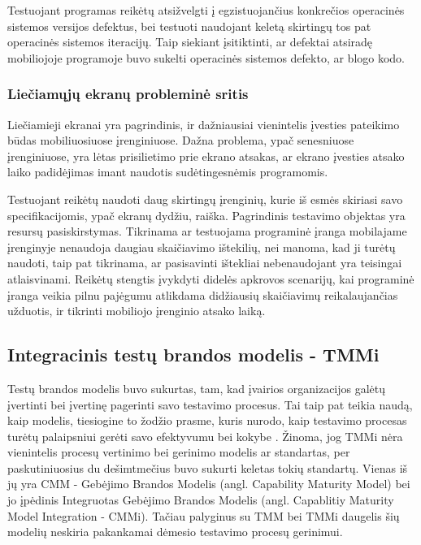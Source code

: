 \documentclass{VUMIFPSkursinis}
\begin{document}
Testuojant programas reikėtų atsižvelgti į egzistuojančius konkrečios operacinės sistemos versijos defektus, bei testuoti naudojant keletą skirtingų tos pat operacinės sistemos iteracijų. Taip siekiant įsitiktinti, ar defektai atsiradę mobiliojoje programoje buvo sukelti operacinės sistemos defekto, ar blogo kodo.

\subsubsection{Liečiamųjų ekranų probleminė sritis}
Liečiamieji ekranai yra pagrindinis, ir dažniausiai vienintelis įvesties pateikimo būdas mobiliuosiuose įrenginiuose. Dažna problema, ypač senesniuose įrenginiuose, yra lėtas prisilietimo prie ekrano atsakas, ar ekrano įvesties atsako laiko padidėjimas imant naudotis sudėtingesnėmis programomis.

Testuojant reikėtų naudoti daug skirtingų įrenginių, kurie iš esmės skiriasi savo specifikacijomis, ypač ekranų dydžiu, raiška. Pagrindinis testavimo objektas yra resursų pasiskirstymas. Tikrinama ar testuojama programinė įranga mobilajame įrenginyje nenaudoja daugiau skaičiavimo ištekilių, nei manoma, kad ji turėtų naudoti, taip pat tikrinama, ar pasisavinti ištekliai nebenaudojant yra teisingai atlaisvinami. Reikėtų stengtis įvykdyti didelės apkrovos scenarijų, kai programinė įranga veikia pilnu pajėgumu atlikdama didžiausių skaičiavimų reikalaujančias užduotis, ir tikrinti mobiliojo įrenginio atsako laiką.

\subsection{Integracinis testų brandos modelis - TMMi}
Testų brandos modelis buvo sukurtas, tam, kad įvairios organizacijos galėtų įvertinti bei įvertinę pagerinti savo testavimo procesus. Tai taip pat teikia naudą, kaip modelis, tiesiogine to žodžio prasme, kuris nurodo, kaip testavimo procesas turėtų  palaipsniui gerėti savo efektyvumu bei kokybe \cite{Burnstein:2010:PST:1965566}. Žinoma, jog TMMi nėra vienintelis procesų vertinimo bei gerinimo modelis ar standartas, per paskutiniuosius du dešimtmečius buvo sukurti keletas tokių standartų. Vienas iš jų yra CMM - Gebėjimo Brandos Modelis (angl. Capability Maturity Model) bei jo įpėdinis Integruotas Gebėjimo Brandos Modelis (angl. Capablitiy Maturity Model Integration - CMMi). Tačiau palyginus su TMM bei TMMi daugelis šių modelių neskiria pakankamai dėmesio testavimo procesų gerinimui. 
\end{document}
